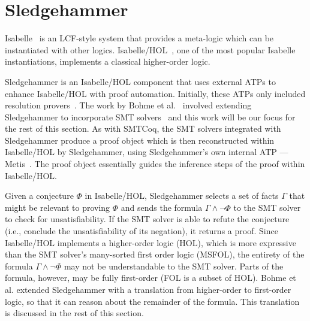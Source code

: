 \documentclass{article}
\begin{document}
\section{Sledgehammer}
\label{sec:hammer}
	Isabelle~\cite{DBLP:journals/corr/cs-LO-9301106} 
	is an LCF-style system that 
	provides a meta-logic which can be 
	instantiated with other logics.
	Isabelle/HOL~\cite{10.5555/1791547}, 
	one of the most popular Isabelle 
	instantiations, implements a 
	classical higher-order logic. 
	
	Sledgehammer is
	an Isabelle/HOL component that 
	uses external ATPs to enhance 
	Isabelle/HOL with proof 
	automation. Initially, these 
	ATPs only included resolution 
	provers~\cite{10.1007/978-3-642-39799-8_1}.
	The work by Bohme et 
	al.~\cite{bohme} involved 
	extending Sledgehammer to 
	incorporate SMT
	solvers~\cite{Barrett2018} and this 
	work will be our focus for the 
	rest of this section. As with 
	SMTCoq, the SMT solvers integrated
	with Sledgehammer produce a 
	proof object which is 
	then reconstructed within
	Isabelle/HOL by Sledgehammer, 
	using Sledgehammer's own internal 
	ATP --- Metis~\cite{hurd2003d}. The 
	proof object essentially guides 
	the inference steps of the proof 
	within Isabelle/HOL.
	
	Given a conjecture $\Phi$ in 
	Isabelle/HOL, Sledgehammer 
	selects a set of facts 
	$\Gamma$ that might be relevant 
	to proving $\Phi$ and sends
	the formula $\Gamma \land \neg 
	\Phi$ to the SMT solver to check 
	for unsatisfiability. If the SMT 
	solver is able to refute the 
	conjecture (i.e., conclude 
	the unsatisfiability of its 
	negation), it returns 
	a proof. Since Isabelle/HOL 
	implements a higher-order logic 
	(HOL), which 
	is more expressive than 
	the SMT solver's many-sorted
	first order logic (MSFOL),
	the entirety of the formula
	$\Gamma \land \neg \Phi$ may not 
	be understandable to the SMT 
	solver. Parts of the formula,
	however, may be fully 
	first-order (FOL is 
	a subset of HOL). Bohme et al.
	extended Sledgehammer with 
	a translation from higher-order 
	to first-order logic, so that 
	it can reason about the remainder
	of the formula. This translation
	is discussed in the rest of this 
	section.
	
\end{document}
